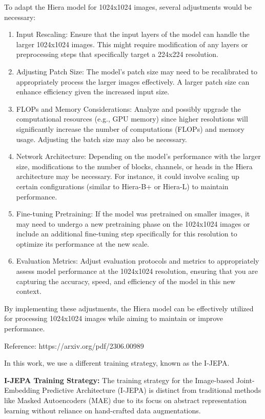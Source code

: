 \documentclass{article} %
\begin{document}
To adapt the Hiera model for 1024x1024 images, several adjustments would be necessary:
\begin{enumerate}
   \item Input Rescaling: Ensure that the input layers of the model can handle the larger 1024x1024 images. This might require modification of any layers or preprocessing steps that specifically target a 224x224 resolution.
   \item Adjusting Patch Size: The model's patch size may need to be recalibrated to appropriately process the larger images effectively. A larger patch size can enhance efficiency given the increased input size.
   \item FLOPs and Memory Considerations: Analyze and possibly upgrade the computational resources (e.g., GPU memory) since higher resolutions will significantly increase the number of computations (FLOPs) and memory usage. Adjusting the batch size may also be necessary.
   \item Network Architecture: Depending on the model's performance with the larger size, modifications to the number of blocks, channels, or heads in the Hiera architecture may be necessary. For instance, it could involve scaling up certain configurations (similar to Hiera-B+ or Hiera-L) to maintain performance.
   \item Fine-tuning Pretraining: If the model was pretrained on smaller images, it may need to undergo a new pretraining phase on the 1024x1024 images or include an additional fine-tuning step specifically for this resolution to optimize its performance at the new scale.
   \item Evaluation Metrics: Adjust evaluation protocols and metrics to appropriately assess model performance at the 1024x1024 resolution, ensuring that you are capturing the accuracy, speed, and efficiency of the model in this new context.
\end{enumerate}

By implementing these adjustments, the Hiera model can be effectively utilized for processing 1024x1024 images while aiming to maintain or improve performance.

Reference: https://arxiv.org/pdf/2306.00989

In this work, we use a different training strategy, known as the I-JEPA.

{\bf I-JEPA Training Strategy:}
The training strategy for the Image-based Joint-Embedding Predictive Architecture (I-JEPA) is distinct from traditional methods like Masked Autoencoders (MAE) due to its focus on abstract representation learning without reliance on hand-crafted data augmentations.
\end{document}
